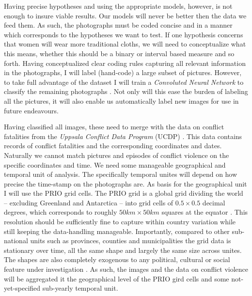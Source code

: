 \documentclass[a4paper]{article}
\begin{document}
Having precise hypotheses and using the appropriate models, however, is not enough to insure viable results. Our models will never be better then the data we feed them. As such, the photographs must be coded concise and in a manner which corresponds to the hypotheses we want to test. If one hypothesis concerns that women will wear more traditional cloths, we will need to conceptualize what this means, whether this should be a binary or interval based measure and so forth. Having conceptualized clear coding rules capturing all relevant information in the photographs, I will label (hand-code) a large subset of pictures. However, to take full advantage of the dataset I will train a \emph{Convoluted Neural Network} to classify the remaining photographs \citep[120-122]{francois2017deep}. Not only will this ease the burden of labeling all the pictures, it will also enable us automatically label new images for use in future endeavours.\par    

Having classified all images, these need to merge with the data on conflict fatalities from the \emph{Uppsala Conflict Data Program} (UCDP) \citep{Sundberg_2013, Croicu_Sundberg_2017, UCDP_2017}. This data contains records of conflict fatalities and the corresponding coordinates and dates. Naturally we cannot match pictures and episodes of conflict violence on the specific coordinates and time. We need some manageable geographical and temporal unit of analysis. The specifically temporal unites will depend on how precise the time-stamp on the photographs are. As basis for the geographical unit I will use the PRIO grid cells. The PRIO grid is a global grid dividing the world -- excluding Greenland and Antarctica -- into grid cells of $0.5 \times 0.5$ decimal degrees, which corresponds to roughly $50km\times50km$ squares at the equator \citep[367]{Tollefsen_2012}. This resolution should be sufficiently fine to capture within country variation while still keeping the data-handling manageable. Importantly, compared to other sub-national units such as provinces, counties and municipalities the grid data is stationary over time, all the same shape and largely the same size across unites. The shapes are also completely exogenous to any political, cultural or social feature under investigation \citep[356]{Tollefsen_2012}. As such, the images and the data on conflict violence will be aggregated it the geographical level of the PRIO gird cells and some not-yet-specified sub-yearly temporal unit.\par
\end{document}
